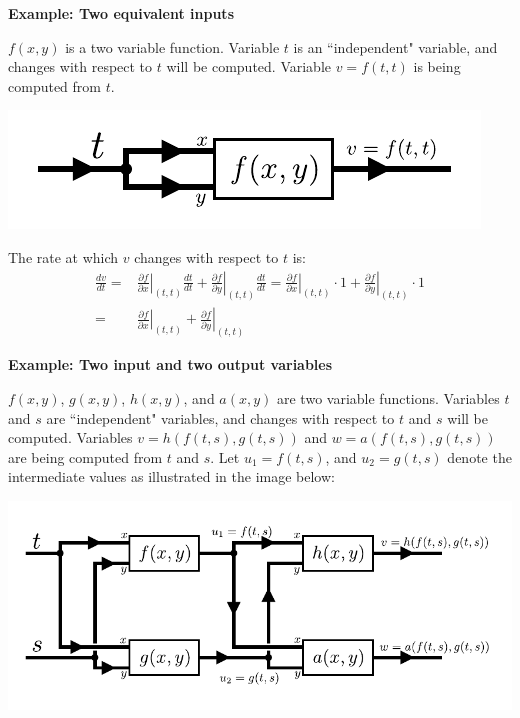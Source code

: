 \documentclass{article}
\begin{document}
\vspace{5mm}

\textbf{Example: Two equivalent inputs}

\(f(x, y)\) is a two variable function. Variable \(t\) is an ``independent" variable, and changes with respect to \(t\) will be computed. Variable \(v = f(t, t)\) is being computed from \(t\).

\begin{center}
\includegraphics[scale = 1.0]{flow_chart_2}
\end{center}

The rate at which \(v\) changes with respect to \(t\) is:
\begin{align*}
\frac{dv}{dt} = & \left.\frac{\partial f}{\partial x}\right|_{(t, t)} \frac{dt}{dt} + \left.\frac{\partial f}{\partial y}\right|_{(t, t)} \frac{dt}{dt} 
= \left.\frac{\partial f}{\partial x}\right|_{(t, t)} \cdot 1 + \left.\frac{\partial f}{\partial y}\right|_{(t, t)} \cdot 1 \\ 
= & \left.\frac{\partial f}{\partial x}\right|_{(t, t)} + \left.\frac{\partial f}{\partial y}\right|_{(t, t)}  
\end{align*}



\vspace{5mm}

\textbf{Example: Two input and two output variables}

\(f(x, y)\), \(g(x, y)\), \(h(x, y)\), and \(a(x, y)\) are two variable functions. Variables \(t\) and \(s\) are ``independent" variables, and changes with respect to \(t\) and \(s\) will be computed. Variables \(v = h(f(t, s), g(t, s))\) and \(w = a(f(t, s), g(t, s))\) are being computed from \(t\) and \(s\). Let \(u_1 = f(t, s)\), and \(u_2 = g(t, s)\) denote the intermediate values as illustrated in the image below:  

\begin{center}
\includegraphics[scale = 1.0]{flow_chart_3}
\end{center}
\end{document}
